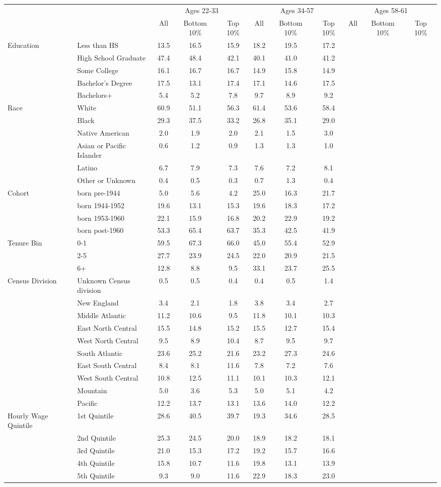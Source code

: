 \begin{tabular}{llccc|ccc|ccc}
\hline\hline
 & & \multicolumn{3}{c|}{Ages 22-33} & \multicolumn{3}{c|}{Ages 34-57} & \multicolumn{3}{c}{Ages 58-61} \\
 & & All & Bottom 10\% & Top 10\% & All & Bottom 10\% & Top 10\% & All & Bottom 10\% & Top 10\% \\
\hline
Education&Less than HS&13.5&16.5&15.9&18.2&19.5&17.2&&&\\
&High School Graduate&47.4&48.4&42.1&40.1&41.0&41.2&&&\\
&Some College&16.1&16.7&16.7&14.9&15.8&14.9&&&\\
&Bachelor's Degree&17.5&13.1&17.4&17.1&14.6&17.5&&&\\
&Bachelors+&5.4&5.2&7.8&9.7&8.9&9.2&&&\\
Race&White&60.9&51.1&56.3&61.4&53.6&58.4&&&\\
&Black&29.3&37.5&33.2&26.8&35.1&29.0&&&\\
&Native American&2.0&1.9&2.0&2.1&1.5&3.0&&&\\
&Asian or Pacific Islander&0.6&1.2&0.9&1.3&1.3&1.0&&&\\
&Latino&6.7&7.9&7.3&7.6&7.2&8.1&&&\\
&Other or Unknown&0.4&0.5&0.3&0.7&1.3&0.4&&&\\
Cohort&born pre-1944&5.0&5.6&4.2&25.0&16.3&21.7&&&\\
&born 1944-1952&19.6&13.1&15.3&19.6&18.3&17.2&&&\\
&born 1953-1960&22.1&15.9&16.8&20.2&22.9&19.2&&&\\
&born post-1960&53.3&65.4&63.7&35.3&42.5&41.9&&&\\
Tenure Bin&0-1&59.5&67.3&66.0&45.0&55.4&52.9&&&\\
&2-5&27.7&23.9&24.5&22.0&20.9&21.5&&&\\
&6+&12.8&8.8&9.5&33.1&23.7&25.5&&&\\
Census Division&Unknown Census division&0.5&0.5&0.4&0.4&0.5&1.4&&&\\
&New England&3.4&2.1&1.8&3.8&3.4&2.7&&&\\
&Middle Atlantic&11.2&10.6&9.5&11.8&10.1&10.3&&&\\
&East North Central&15.5&14.8&15.2&15.5&12.7&15.4&&&\\
&West North Central&9.5&8.9&10.4&8.7&9.5&9.7&&&\\
&South Atlantic&23.6&25.2&21.6&23.2&27.3&24.6&&&\\
&East South Central&8.4&8.1&11.6&7.8&7.2&7.6&&&\\
&West South Central&10.8&12.5&11.1&10.1&10.3&12.1&&&\\
&Mountain&5.0&3.6&5.3&5.0&5.1&4.2&&&\\
&Pacific&12.2&13.7&13.1&13.6&14.0&12.2&&&\\
Hourly Wage Quintile&1st Quintile&28.6&40.5&39.7&19.3&34.6&28.5&&&\\
&2nd Quintile&25.3&24.5&20.0&18.9&18.2&18.1&&&\\
&3rd Quintile&21.0&15.3&17.2&19.2&15.7&16.6&&&\\
&4th Quintile&15.8&10.7&11.6&19.8&13.1&13.9&&&\\
&5th Quintile&9.3&9.0&11.6&22.9&18.3&23.0&&&\\
\hline\hline
\end{tabular}
